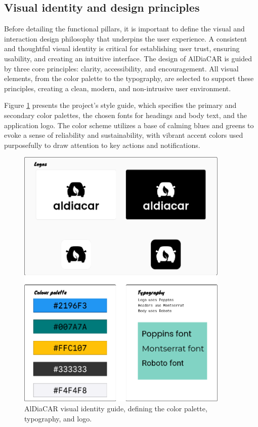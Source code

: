 \textgap

\subsection{Visual identity and design principles}

Before detailing the functional pillars, it is important to define the visual and interaction design philosophy that underpins the user experience. A consistent and thoughtful visual identity is critical for establishing user trust, ensuring usability, and creating an intuitive interface. The design of AlDiaCAR is guided by three core principles: clarity, accessibility, and encouragement. All visual elements, from the color palette to the typography, are selected to support these principles, creating a clean, modern, and non-intrusive user environment.

\textgap

Figure \ref{fig:visual-identity} presents the project's style guide, which specifies the primary and secondary color palettes, the chosen fonts for headings and body text, and the application logo. The color scheme utilizes a base of calming blues and greens to evoke a sense of reliability and sustainability, with vibrant accent colors used purposefully to draw attention to key actions and notifications.

\begin{figure}[H]
    \centering
    \includegraphics[width=0.9\textwidth]{images/branding/moodboard.png}
    \caption{AlDiaCAR visual identity guide, defining the color palette, typography, and logo.}
    \label{fig:visual-identity}
\end{figure}

